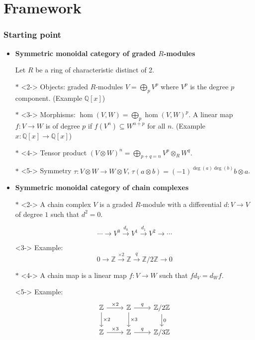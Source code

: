 \documentclass{beamer}
\theoremstyle{definition}
\newcommand{\Z}{\mathbb{Z}}
\newcommand{\Q}{\mathbb{Q}}
\begin{document}
\section{Framework}
\begin{frame}
\frametitle{Starting point}

\begin{itemize}
\item<1-> \textbf{Symmetric monoidal category of graded $R$-modules} 

Let $R$ be a ring of characteristic distinct of 2. 
\item[$\ast$]<2-> Objects: graded $R$-modules $V=\bigoplus_p V^p$ where $V^p$ is the degree $p$ component. (Example $\Q[x]$)
\item[$\ast$]<3-> Morphisms: $\hom(V,W)=\bigoplus_p \hom(V,W)^p$. A linear map $f:V\to W$ is of degree $p$ if $f(V^n)\subseteq W^{n+p}$ for all $n$. (Example $x:\Q[x]\to \Q[x]$)
\item[$\ast$]<4-> Tensor product $(V\otimes W)^n=\bigoplus_{p+q=n} V^p\otimes_R W^q$. 
\item[$\ast$]<5-> Symmetry $\tau:V\otimes W\to W\otimes V$, $\tau(a\otimes b)=(-1)^{\deg(a)\deg(b)}b\otimes a$.
\end{itemize}
\end{frame}

\begin{frame}[fragile]
\begin{itemize}
\item<1-> \textbf{Symmetric monoidal category of chain complexes}
\item[$\ast$]<2-> A chain complex $V$ is a graded $R$-module with a differential $d:V\to V$ of degree $1$ such that $d^2=0$.

\[\cdots\to V^0\xrightarrow{d_0}V^1\xrightarrow{d_1}V^2\to\cdots\]
\item[]<3-> Example:
\[0\to \Z\xrightarrow{\times 2}\Z\xrightarrow{q}\Z/2\Z\to 0\]
\item[$\ast$]<4-> A chain map is a linear map $f:V\to W$ such that $fd_V=d_Wf$. %
\item[]<5-> Example:
\[
\begin{tikzcd}
\Z\ar[r,"\times 2"]\ar[d,"\times 2"] &\Z\ar[r,"q"]\ar[d,"\times 3"]&\Z/2\Z\ar[d,"0"]\\
\Z\ar[r,"\times 3"] &\Z\ar[r,"q"]&\Z/3\Z
\end{tikzcd}
\]
\end{itemize}
\end{frame}
\end{document}
